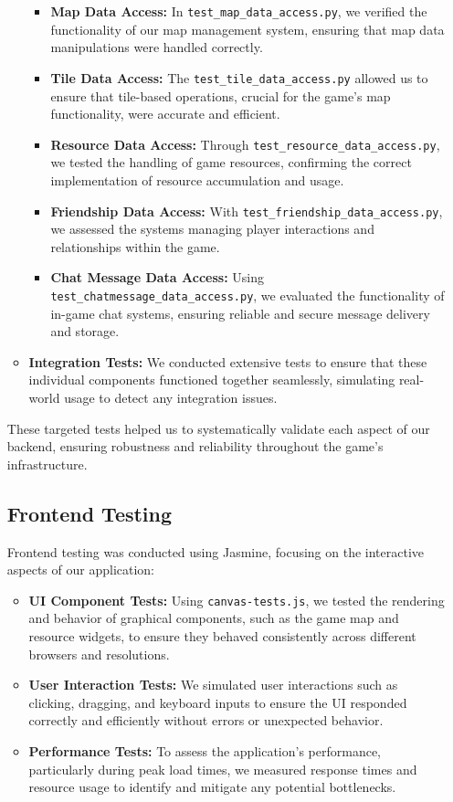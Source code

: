 \documentclass[12pt]{article}
\begin{document}
\begin{itemize}
\begin{itemize}
\begin{itemize}
        \item \textbf{Map Data Access:} In \texttt{test\_map\_data\_access.py}, we verified the functionality of our map management system, ensuring that map data manipulations were handled correctly.
        \item \textbf{Tile Data Access:} The \texttt{test\_tile\_data\_access.py} allowed us to ensure that tile-based operations, crucial for the game's map functionality, were accurate and efficient.
        \item \textbf{Resource Data Access:} Through \texttt{test\_resource\_data\_access.py}, we tested the handling of game resources, confirming the correct implementation of resource accumulation and usage.
        \item \textbf{Friendship Data Access:} With \texttt{test\_friendship\_data\_access.py}, we assessed the systems managing player interactions and relationships within the game.
        \item \textbf{Chat Message Data Access:} Using \texttt{test\_chatmessage\_data\_access.py}, we evaluated the functionality of in-game chat systems, ensuring reliable and secure message delivery and storage.
    \end{itemize}
    \item \textbf{Integration Tests:} We conducted extensive tests to ensure that these individual components functioned together seamlessly, simulating real-world usage to detect any integration issues.
\end{itemize}
These targeted tests helped us to systematically validate each aspect of our backend, ensuring robustness and reliability throughout the game's infrastructure.

\subsection{Frontend Testing}
Frontend testing was conducted using Jasmine, focusing on the interactive aspects of our application:
\begin{itemize}
    \item \textbf{UI Component Tests:} Using \texttt{canvas-tests.js}, we tested the rendering and behavior of graphical components, such as the game map and resource widgets, to ensure they behaved consistently across different browsers and resolutions.
    \item \textbf{User Interaction Tests:} We simulated user interactions such as clicking, dragging, and keyboard inputs to ensure the UI responded correctly and efficiently without errors or unexpected behavior.
    \item \textbf{Performance Tests:} To assess the application’s performance, particularly during peak load times, we measured response times and resource usage to identify and mitigate any potential bottlenecks.
\end{itemize}

\end{itemize}
\end{document}
